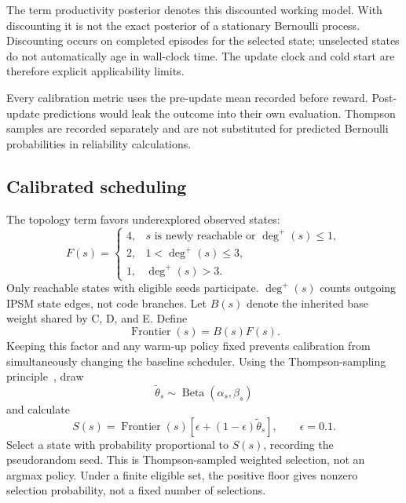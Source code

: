 \documentclass[final,5p,times,number]{elsarticle}
\begin{document}
The term productivity posterior denotes this discounted working model. With discounting it is not the exact posterior of a stationary Bernoulli process. Discounting occurs on completed episodes for the selected state; unselected states do not automatically age in wall-clock time. The update clock and cold start are therefore explicit applicability limits.

Every calibration metric uses the pre-update mean recorded before reward. Post-update predictions would leak the outcome into their own evaluation. Thompson samples are recorded separately and are not substituted for predicted Bernoulli probabilities in reliability calculations.

\subsection{Calibrated scheduling}
The topology term favors underexplored observed states:
\begin{equation}
F(s)=
\begin{cases}
4,&s\text{ is newly reachable or }\deg^+(s)\leq1,\\
2,&1<\deg^+(s)\leq3,\\
1,&\deg^+(s)>3.
\end{cases}
\end{equation}
Only reachable states with eligible seeds participate. $\deg^+(s)$ counts outgoing IPSM state edges, not code branches. Let $B(s)$ denote the inherited base weight shared by C, D, and E. Define
\begin{equation}
\operatorname{Frontier}(s)=B(s)F(s).
\end{equation}
Keeping this factor and any warm-up policy fixed prevents calibration from simultaneously changing the baseline scheduler. Using the Thompson-sampling principle~\cite{thompson1933}, draw
\begin{equation}
\widetilde{\theta}_s\sim\operatorname{Beta}(\alpha_s,\beta_s)
\end{equation}
and calculate
\begin{equation}
S(s)=\operatorname{Frontier}(s)[\epsilon+(1-\epsilon)\widetilde{\theta}_s],
\qquad\epsilon=0.1.
\label{eq:score}
\end{equation}
Select a state with probability proportional to $S(s)$, recording the pseudorandom seed. This is Thompson-sampled weighted selection, not an argmax policy. Under a finite eligible set, the positive floor gives nonzero selection probability, not a fixed number of selections.
\end{document}
